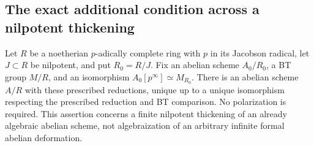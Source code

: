 \subsection{The exact additional condition across a nilpotent thickening}

\begin{lemma}
\label{lem:C-RD12-complete}
Let $R$ be a noetherian $p$-adically complete ring with $p$ in its
Jacobson radical, let $J\subset R$ be nilpotent, and put $R_0=R/J$.
Fix an abelian scheme $A_0/R_0$, a BT group $M/R$, and an
isomorphism $A_0[p^\infty]\simeq M_{R_0}$. There is an abelian scheme
$A/R$ with these prescribed reductions, unique up to a unique
isomorphism respecting the prescribed reduction and BT comparison.
No polarization is required. This assertion concerns a finite
nilpotent thickening of an already algebraic abelian scheme, not
algebraization of an arbitrary infinite formal abelian deformation.
\end{lemma}
